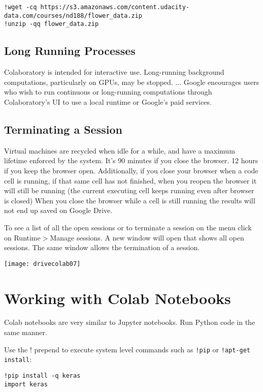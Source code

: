 \begin{lstlisting}
!wget -cq https://s3.amazonaws.com/content.udacity-data.com/courses/nd188/flower_data.zip
!unzip -qq flower_data.zip
\end{lstlisting}

\subsection{Long Running Processes}

Colaboratory is intended for interactive use. Long-running background computations, particularly on GPUs, may be stopped. ... Google encourages users who wish to run continuous or long-running computations through Colaboratory’s UI to use a local runtime or Google's paid services.




\subsection{Terminating a Session}

Virtual machines are recycled when idle for a while, and have a maximum lifetime enforced by the system.
It's 90 minutes if you close the browser. 12 hours if you keep the browser open. Additionally, if you close your browser when a code cell is running, if that same cell has not finished, when you reopen the browser it will still be running (the current executing cell keeps running even after browser is closed)
When you close the browser while a cell is still running the results will not end up saved on Google Drive.


To see a list of all the open sessions or to terminate a session on the menu click on Runtime$>$Manage sessions.  A new window will open that shows all open sessions.  The same window allows the termination of a session.
\begin{marginfigure}
\texttt{[image: drivecolab07]}
\end{marginfigure}




\section{Working with Colab Notebooks}

Colab notebooks are very similar to Jupyter notebooks.
Run Python code in the same manner.

Use the ! prepend to execute system level commands such as \lstinline{!pip} or \lstinline{!apt-get install}:
\begin{lstlisting}
!pip install -q keras
import keras
\end{lstlisting}



